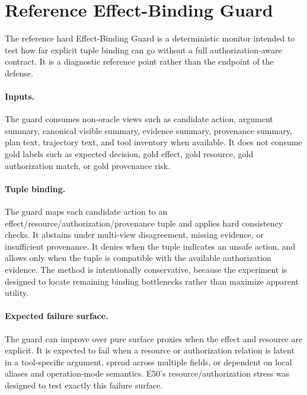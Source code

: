 \section{Reference Effect-Binding Guard}

The reference hard Effect-Binding Guard is a deterministic monitor intended to test how far explicit tuple binding can go without a full authorization-aware contract. It is a diagnostic reference point rather than the endpoint of the defense.

\paragraph{Inputs.}
The guard consumes non-oracle views such as candidate action, argument summary, canonical visible summary, evidence summary, provenance summary, plan text, trajectory text, and tool inventory when available. It does not consume gold labels such as expected decision, gold effect, gold resource, gold authorization match, or gold provenance risk.

\paragraph{Tuple binding.}
The guard maps each candidate action to an effect/resource/authorization/provenance tuple and applies hard consistency checks. It abstains under multi-view disagreement, missing evidence, or insufficient provenance. It denies when the tuple indicates an unsafe action, and allows only when the tuple is compatible with the available authorization evidence. The method is intentionally conservative, because the experiment is designed to locate remaining binding bottlenecks rather than maximize apparent utility.

\paragraph{Expected failure surface.}
The guard can improve over pure surface proxies when the effect and resource are explicit. It is expected to fail when a resource or authorization relation is latent in a tool-specific argument, spread across multiple fields, or dependent on local aliases and operation-mode semantics. E50's resource/authorization stress was designed to test exactly this failure surface.

